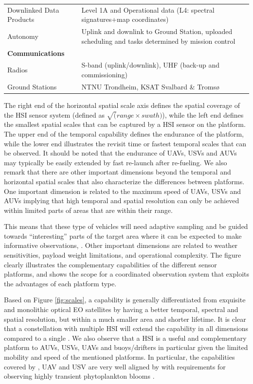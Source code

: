\begin{table}[htbp]
\begin{tabular}{|l|p{12cm}|}
			Downlinked Data Products & Level 1A and Operational data (L4: spectral signatures+map coordinates) \\
			Autonomy & Uplink and downlink to Ground Station, uploaded scheduling and tasks determined by mission control \\
		  \hline
			\textbf{Communications} &			 			\\ 
			\hline
			Radios      &  S-band (uplink/downlink), UHF (back-up and commissioning) \\
			Ground Stations & NTNU Trondheim, KSAT Svalbard \& Troms{\o} \\
			\hline
		\end{tabular}
	  \label{tab:mission_concept}
\end{table}

The right end of the horizontal spatial scale axis defines the spatial
coverage of the HSI sensor system (defined as
$\sqrt( range \times swath)$), while the left end defines the smallest
spatial scales that can be captured by a HSI sensor on the
platform. The upper end of the temporal capability defines the
endurance of the platform, while the lower end illustrates the revisit
time or fastest temporal scales that can be observed. It should be
noted that the endurance of UAVs, USVs and AUVs may typically be
easily extended by fast re-launch after re-fueling. We also remark
that there are other important dimensions beyond the temporal and
horizontal spatial scales that also characterize the differences
between platforms. One important dimension is related to the maximum
speed of UAVs, USVs and AUVs implying that high temporal and spatial
resolution can only be achieved within limited parts of areas
that are within their range. 

This means that these type of vehicles will need adaptive sampling and
be guided towards ``interesting'' parts of the target area where it can be
expected to make informative observations, \cite{Bel93}. Other
important dimensions are related to weather sensitivities, payload
weight limitations, and operational complexity. The figure clearly
illustrates the complementary capabilities of the different sensor
platforms, and shows the scope for a coordinated observation system
that exploits the advantages of each platform type.

Based on Figure \ref{fig:scales}, a \sml capability is generally
differentiated from exquisite and monolithic optical EO satellites 
by having a better temporal, spectral and spatial resolution, but
within a much smaller area and shorter lifetime. It is clear that a
constellation with multiple HSI \sml will extend the capability in
all dimensions compared to a single \smle. We also observe that a HSI
\sml is a useful and complementary platform to AUVs, USVs, UAVs and
buoys/drifters in particular given the limited mobility and speed of
the mentioned platforms. In particular, the capabilities covered by
\smle, UAV and USV are very well aligned by with requirements for
observing highly transient phytoplankton blooms \cite{Dic05}.

